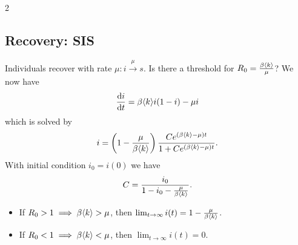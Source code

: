 \documentclass[a4paper,9pt]{extarticle}
\begin{document}
\begin{multicols*}{2}
	\subsection{Recovery: SIS}
	Individuals recover with rate $\mu:i\xrightarrow{\mu}s$. Is there a threshold for $R_{0}=\frac{\beta\langle k \rangle}{\mu}$? We now have
	\begin{equation*}
		\frac{\mathrm{d} i}{\mathrm{d} t}=\beta\langle k \rangle i(1-i)-\mu i
	\end{equation*}
	which is solved by
	\begin{equation*}
		i=\left(1-\frac{\mu}{\beta\langle k \rangle}\right)\frac{Ce^{(\beta\langle k \rangle-\mu)t}}{1+Ce^{\left(\beta\langle k \rangle-\mu\right)t}}.
	\end{equation*}
	With initial condition $i_{0}=i(0)$ we have
	\begin{equation*}
		C=\frac{i_{0}}{1-i_{0}-\frac{\mu}{\beta\langle k \rangle}}.
	\end{equation*}
	\begin{itemize}
		\item If $R_{0}>1\implies \beta\langle k \rangle>\mu$, then $\lim_{t\to\infty}i(t)=1-\frac{\mu}{\beta\langle k \rangle}$.
		\item If $R_{0}<1\implies \beta\langle k \rangle<\mu$, then $\lim_{t\to\infty}i(t)=0$.
	\end{itemize}

\end{multicols*}
\end{document}
